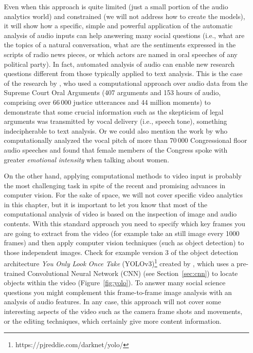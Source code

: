 Even when this approach is quite limited (just a small portion of the audio analytics world) and constrained (we will not address how to create the models), it will show how a specific, simple and powerful application of the automatic analysis of audio inputs can help answering many social questions (i.e., what are the topics of a natural conversation, what are the sentiments expressed in the scripts of radio news pieces, or which actors are named in oral speeches of any political party). In fact, automated analysis of audio can enable new research questions different from those typically applied to text analysis. This is the case of the research by \cite{knox2021dynamic},  who used a computational approach over audio data from the Supreme Court Oral Arguments (407 arguments and 153 hours of audio, comprising over 66\,000 justice utterances and 44 million moments) to demonstrate that some crucial information such as the skepticism of legal arguments was transmitted by vocal delivery (i.e., speech tone), something indecipherable to text analysis. Or we could also mention the work by \cite{dietrich2019pitch} who computationally analyzed the vocal pitch of more than 70\,000 Congressional floor audio speeches and found that female members of the Congress spoke with greater \textit{emotional intensity} when talking about women.

On the other hand, applying computational methods to video input is probably the most challenging task in spite of the recent and promising advances in computer vision. For the sake of space, we will not cover specific video analytics in this chapter, but it is important to let you know that most of the computational analysis of video is based on the inspection of image and audio contents. With this standard approach you need to specify which key frames you are going to extract from the video (for example take an still image every 1000 frames) and then apply computer vision techniques (such as object detection) to those independent images. Check for example  version 3 of the object detection architecture \textit{You Only Look Once Take} (YOLOv3)\footnote{https://pjreddie.com/darknet/yolo/} created by \citet{yolov3}, which uses a pre-trained Convolutional Neural Network (CNN) (see Section~\ref{sec:cnn}) to locate objects within the video (Figure~\ref{fig:yolo}). To answer many social science questions you might complement this frame-to-frame image analysis with an analysis of audio features. In any case, this approach will not cover some interesting aspects of the video such as the camera frame shots and movements, or the editing techniques, which certainly give more content information.


